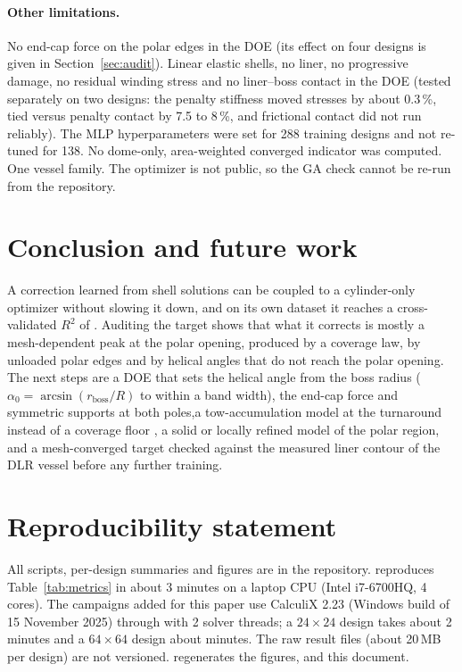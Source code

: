 \documentclass[11pt]{article}
\begin{document}
\paragraph{Other limitations.} No end-cap force on the polar edges in the DOE (its effect on four designs is given in Section~\ref{sec:audit}). Linear elastic shells, no liner, no progressive damage, no residual winding stress and no liner--boss contact in the DOE (tested separately on two designs: the penalty stiffness moved stresses by about 0.3\,\%, tied versus penalty contact by 7.5 to 8\,\%, and frictional contact did not run reliably). The MLP hyperparameters were set for 288 training designs and not re-tuned for 138. No dome-only, area-weighted converged indicator was computed. One vessel family. The optimizer is not public, so the GA check cannot be re-run from the repository.

\section{Conclusion and future work}
A correction learned from \NdoeCases{} shell solutions can be coupled to a cylinder-only optimizer without slowing it down, and on its own dataset it reaches a cross-validated $R^2$ of \RtwoCvMlp{}. Auditing the target shows that what it corrects is mostly a mesh-dependent peak at the polar opening, produced by a coverage law, by unloaded polar edges and by helical angles that do not reach the polar opening. The next steps are a DOE that sets the helical angle from the boss radius ($\alpha_0 = \arcsin(r_{\mathrm{boss}}/R)$ to within a band width), the end-cap force and symmetric supports at both poles,a tow-accumulation model at the turnaround instead of a coverage floor \cite{Wang2022}, a solid or locally refined model of the polar region, and a mesh-converged target checked against the measured liner contour of the DLR vessel before any further training.

\section*{Reproducibility statement}
All scripts, per-design summaries and figures are in the repository.  reproduces Table~\ref{tab:metrics} in about 3 minutes on a laptop CPU (Intel i7-6700HQ, 4 cores). The campaigns added for this paper use CalculiX 2.23 (Windows build of 15 November 2025) through  with 2 solver threads; a $24\times24$ design takes about 2 minutes and a $64\times64$ design about \MeshTimeSixtyFour{} minutes. The raw result files (about 20\,MB per design) are not versioned.  regenerates the figures,  and this document.



\end{document}
